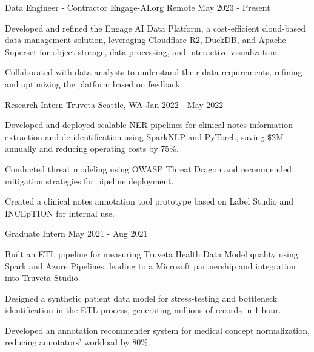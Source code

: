 \vspace{-4mm}
\vspace{-2mm}

\begin{cventries}
	\cventry
	{Data Engineer - Contractor}
	{Engage-AI.org}
	{Remote}
	{May 2023 - Present}
	{\begin{cvitems}
			\item {Developed and refined the Engage AI Data Platform, a cost-efficient cloud-based data management solution, leveraging Cloudflare R2, DuckDB, and Apache Superset for object storage, data processing, and interactive visualization.
			}
			\item {Collaborated with data analysts to understand their data requirements, refining and optimizing the platform based on feedback.}
		\end{cvitems}}
	\vspace{-1mm}

	\cventry
	{Research Intern}
	{Truveta}
	{Seattle, WA}
	{Jan 2022 - May 2022}
	{\begin{cvitems}
			\item {Developed and deployed scalable NER pipelines for clinical notes information extraction and de‑identification using SparkNLP and PyTorch, saving \$2M annually and reducing operating costs by 75\%.}
			\item {Conducted threat modeling using OWASP Threat Dragon and recommended mitigation strategies for pipeline deployment.}
			\item {Created a clinical notes annotation tool prototype based on Label Studio and INCEpTION for internal use.}
		\end{cvitems}}
	\vspace{1mm}
	\cventry
	{Graduate Intern}
	{}
	{}
	{May 2021 - Aug 2021}
	{\begin{cvitems}
			\item {Built an ETL pipeline for measuring Truveta Health Data Model quality using Spark and Azure Pipelines, leading to a Microsoft partnership and integration into Truveta Studio.}
			\item {Designed a synthetic patient data model for stress-testing and bottleneck identification in the ETL process, generating millions of records in 1 hour.}
			\item {Developed an annotation recommender system for medical concept normalization, reducing annotators' workload by 80\%.}
		\end{cvitems}}


\end{cventries}
